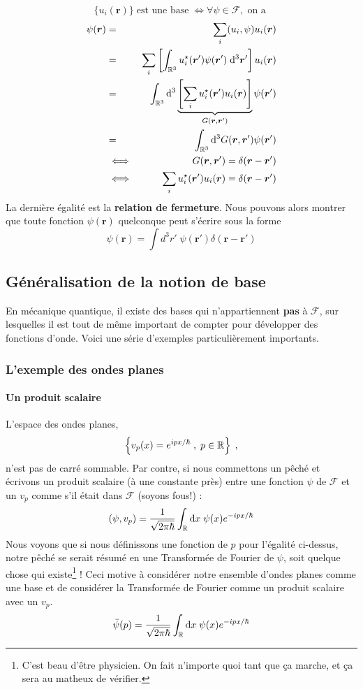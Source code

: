\documentclass[../notesdecours.tex]{subfiles}
\begin{document}
$$\{u_i(\bm{r})\} \; \text{est une base} \; \iff \forall \psi \in \mathcal F, \;\text{on a }$$
\begin{eqnarray}
\psi(\bm{r}) &=& \sum_i (u_i, \psi) u_i(\bm{r}) \\
&=& \sum_i \left[\int_{\mathbb R ^3} u_i ^\star(\bm{r}') \psi(\bm{r}') \; \mathrm{d} ^3 \bm{r}'\right] u_i(\bm{r}) \\
&=& \int_{\mathbb R ^3}\mathrm{d} ^3  \underbrace{\left[\sum_iu_i ^\star(\bm{r}')u_i(\bm{r}) \right]}_{G(\bm{r}, \bm{r}')}\psi(\bm{r}') \\
&=& \int_{\mathbb R ^3}\mathrm{d} ^3 G(\bm{r}, \bm{r}')\psi(\bm{r}') \\
&\iff& G(\bm{r}, \bm{r}') = \delta(\bm{r}-\bm{r}') \\
&\iff& \sum_iu_i ^\star(\bm{r}')u_i(\bm{r}) = \delta(\bm{r}-\bm{r}') 
\end{eqnarray}
La dernière égalité est la \textbf{relation de fermeture}. Nous pouvons alors montrer que toute fonction $\psi(\bm{r})$ quelconque peut s'écrire sous la forme
\begin{equation}
\psi(\bm{r}) = \int d^3r' \; \psi(\bm{r}') \delta (\bm{r} - \bm{r}')
\label{implication relation de fermeture}
\end{equation}
\subsection{Généralisation de la notion de base}
En mécanique quantique, il existe des bases qui n'appartiennent \textbf{pas} à $\mathcal F$, sur lesquelles il est tout de même important de compter pour développer des fonctions d'onde. Voici une série d'exemples particulièrement importants.
\subsubsection{L'exemple des ondes planes}
\paragraph{Un produit scalaire}
L'espace des ondes planes,
$$\left\{ v_p(x) = e^{ipx/\hbar} \; , \; p \in \mathbb{R} \right\}\; ,$$
n'est pas de carré sommable. Par contre, si nous commettons un pêché et écrivons un produit scalaire (à une constante près) entre une fonction $\psi$ de $\mathcal F$ et un $v_p$ comme s'il était dans $\mathcal F$ (soyons fous!) :
$$(\psi, v_p) = \dfrac{1}{\sqrt{2\pi\hbar}} \int_{\mathbb R}\mathrm{d} x \; \psi(x) e^{-ipx/\hbar}$$
Nous voyons que si nous définissons une fonction de $p$ pour l'égalité ci-dessus, notre pêché se serait résumé en une Transformée de Fourier de $\psi$, soit quelque chose qui existe\footnote{C'est beau d'être physicien. On fait n'importe quoi tant que ça marche, et ça sera au matheux de vérifier.} ! Ceci motive à considérer notre ensemble d'ondes planes comme une base et de considérer la Transformée de Fourier comme un produit scalaire avec un $v_p$.
$$\bar{\psi}(p) = \dfrac{1}{\sqrt{2\pi\hbar}} \int_{\mathbb R}\mathrm{d} x \; \psi(x) e^{-ipx/\hbar}$$
\end{document}

